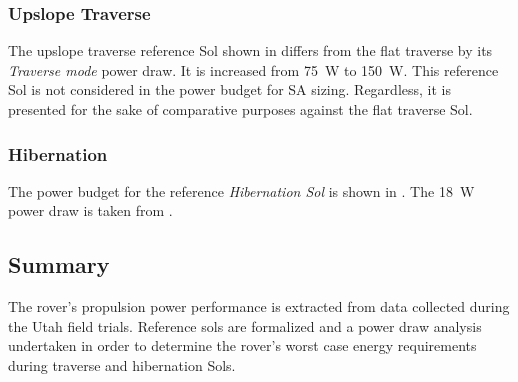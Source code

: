 \subsubsection{Upslope Traverse}
\label{sec:Design:PowerBudget:TraversePowerBudget:UpslopeTraverse}
The upslope traverse reference Sol shown in  differs from the flat traverse by its \textit{Traverse mode} power draw. It is increased from \SI{75}{\watt} to \SI{150}{\watt}. This reference Sol is not considered in the power budget for \ac{SA} sizing. Regardless, it is presented for the sake of comparative purposes against the flat traverse Sol.



\subsubsection{Hibernation}
\label{sec:Design:PowerBudget:TraversePowerBudget:Hibernation}
The power budget for the reference \textit{Hibernation Sol} is shown in . The \SI{18}{\watt} power draw is taken from .



\subsection{Summary}
\label{sec:PowerBudget:Summary}
The rover's propulsion power performance is extracted from data collected during the Utah field trials. Reference sols are formalized and a power draw analysis undertaken in order to determine the rover's worst case energy requirements during traverse and hibernation Sols.
